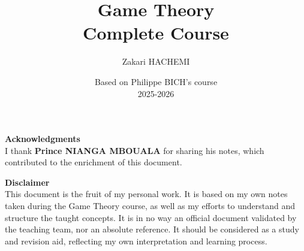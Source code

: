 \documentclass[11pt,a4paper,oneside]{book}
\title{\textbf{Game Theory}\\[0.5em]
       \large Complete Course}
\author{Zakari HACHEMI}
\date{Based on Philippe BICH's course \\ 2025-2026}
\numberwithin{equation}{chapter}
\theoremstyle{plain}
\theoremstyle{definition}
\theoremstyle{remark}
\begin{document}

\maketitle

\clearpage
\thispagestyle{empty}
\vspace*{4cm}

\noindent \textbf{Acknowledgments} \\
I thank \textbf{Prince NIANGA MBOUALA} for sharing his notes, which contributed to the enrichment of this document.

\vspace{1.5cm}

\noindent \textbf{Disclaimer} \\
This document is the fruit of my personal work. It is based on my own notes taken during the Game Theory course, as well as my efforts to understand and structure the taught concepts.
It is in no way an official document validated by the teaching team, nor an absolute reference. It should be considered as a study and revision aid, reflecting my own interpretation and learning process.

\tableofcontents


\mainmatter










\appendix
\end{document}
